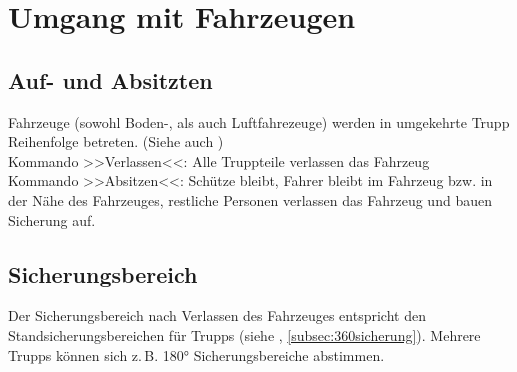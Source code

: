 \pagebreak
\section{Umgang mit Fahrzeugen}
\subsection{Auf- und Absitzten}
	Fahrzeuge (sowohl Boden-, als auch Luftfahrezeuge) werden in umgekehrte Trupp Reihenfolge betreten. (Siehe auch )\\
	
	Kommando >>Verlassen<<: Alle Truppteile verlassen das Fahrzeug \\
	Kommando >>Absitzen<<: Schütze bleibt, Fahrer bleibt im Fahrzeug bzw. in der Nähe des Fahrzeuges, restliche Personen verlassen das Fahrzeug und bauen Sicherung auf.
	
\subsection{Sicherungsbereich}
	Der Sicherungsbereich nach Verlassen des Fahrzeuges entspricht den Standsicherungsbereichen für  Trupps (siehe , \autoref{subsec:360sicherung}). Mehrere Trupps können sich z.\,B. 180° Sicherungsbereiche abstimmen. \\
	
